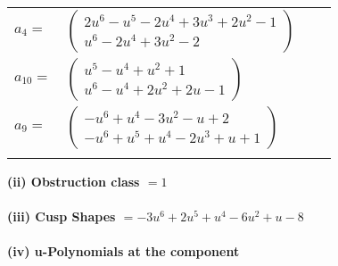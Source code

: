 \documentclass[1p]{elsarticle_modified}
\theoremstyle{definition}
\begin{document}
\begin{tabular}{m{7pt} m{180pt} m{7pt} m{180pt} }
\flushright $a_{4}=$&$\begin{pmatrix}2 u^6- u^5-2 u^4+3 u^3+2 u^2-1\\u^6-2 u^4+3 u^2-2\end{pmatrix}$ \\
\flushright $a_{10}=$&$\begin{pmatrix}u^5- u^4+u^2+1\\u^6- u^4+2 u^2+2 u-1\end{pmatrix}$ \\
\flushright $a_{9}=$&$\begin{pmatrix}- u^6+u^4-3 u^2- u+2\\- u^6+u^5+u^4-2 u^3+u+1\end{pmatrix}$\\&\end{tabular}
\flushleft \textbf{(ii) Obstruction class $= 1$}\\~\\
\flushleft \textbf{(iii) Cusp Shapes $= -3 u^6+2 u^5+u^4-6 u^2+u-8$}\\~\\
\newpage\renewcommand{\arraystretch}{1}
\flushleft \textbf{(iv) u-Polynomials at the component}\newline \\
\end{document}
